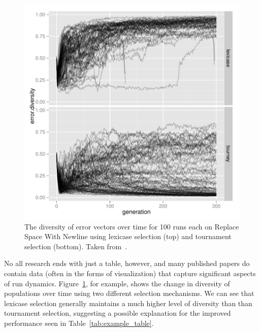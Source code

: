 \begin{figure}
	\includegraphics[width=\linewidth]{Figures/rswn_diversity}
	\caption{The diversity of error vectors over time for 100 runs each
	on Replace Space With Newline using lexicase selection (top) and 
    tournament selection (bottom). Taken from~\cite{diversity_gecco}.}
	\label{fig:rswndiversity}
\end{figure}

No all research ends with just a table, however, and many published papers
do contain data (often in the forms of visualization) that capture
significant aspects of run dynamics. Figure~\ref{fig:rswndiversity}, for
example, shows the change in diversity of populations over time using
two different selection mechanisms. We can see that lexicase
selection generally maintains a much higher level of diversity than
than tournament selection, suggesting a possible explanation for the
improved performance seen in Table~\ref{tab:example_table}.

